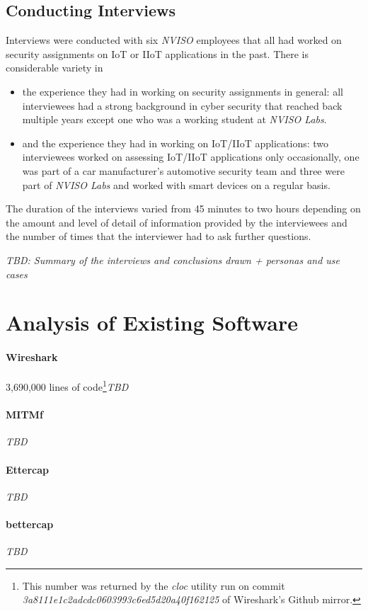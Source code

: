 \subsection{Conducting Interviews}
Interviews were conducted with six %
\emph{NVISO} employees that all had worked on security assignments on \ac{IoT} or \ac{IIoT} applications in the past. There is considerable variety in
\begin{itemize}
    \item the experience they had in working on security assignments in general: all interviewees had a strong background in cyber security that reached back multiple years except one who was a working student at \emph{NVISO Labs}.
    \item and the experience they had in working on \ac{IoT}/\ac{IIoT} applications: two interviewees worked on assessing \ac{IoT}/\ac{IIoT} applications only occasionally, one was part of a car manufacturer's automotive security team and three were part of \emph{NVISO Labs} and worked with smart devices on a regular basis.
\end{itemize}
The duration of the interviews varied from 45 minutes to two hours depending on the amount and level of detail of information provided by the interviewees and the number of times that the interviewer had to ask further questions.

\emph{TBD: Summary of the interviews and conclusions drawn + personas and use cases}

\section{Analysis of Existing Software}
\paragraph{Wireshark} 3,690,000 lines of code\footnote{This number was returned by the \emph{cloc} utility run on commit \emph{3a8111e1c2adcdc0603993c6ed5d20a40f162125} of Wireshark's Github mirror.}\emph{TBD}
\paragraph{MITMf} \emph{TBD}
\paragraph{Ettercap} \emph{TBD}
\paragraph{bettercap} \emph{TBD}
